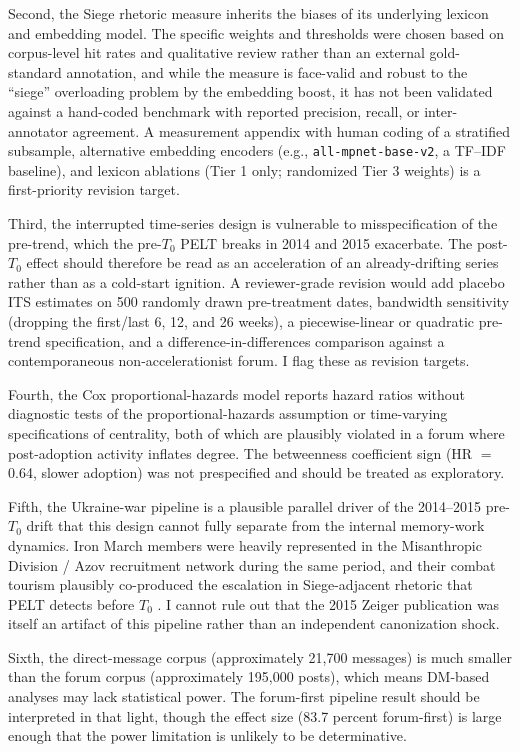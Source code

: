 \documentclass[bibtex,autowc,nonblind]{apsr_submission}
\begin{document}
Second, the Siege rhetoric measure inherits the biases of its underlying lexicon and embedding model. The specific weights and thresholds were chosen based on corpus-level hit rates and qualitative review rather than an external gold-standard annotation, and while the measure is face-valid and robust to the ``siege'' overloading problem by the embedding boost, it has not been validated against a hand-coded benchmark with reported precision, recall, or inter-annotator agreement. A measurement appendix with human coding of a stratified subsample, alternative embedding encoders (e.g., \texttt{all-mpnet-base-v2}, a TF--IDF baseline), and lexicon ablations (Tier 1 only; randomized Tier 3 weights) is a first-priority revision target.

Third, the interrupted time-series design is vulnerable to misspecification of the pre-trend, which the pre-$T_0$ PELT breaks in 2014 and 2015 exacerbate. The post-$T_0$ effect should therefore be read as an acceleration of an already-drifting series rather than as a cold-start ignition. A reviewer-grade revision would add placebo ITS estimates on 500 randomly drawn pre-treatment dates, bandwidth sensitivity (dropping the first/last 6, 12, and 26 weeks), a piecewise-linear or quadratic pre-trend specification, and a difference-in-differences comparison against a contemporaneous non-accelerationist forum. I flag these as revision targets.

Fourth, the Cox proportional-hazards model reports hazard ratios without diagnostic tests of the proportional-hazards assumption or time-varying specifications of centrality, both of which are plausibly violated in a forum where post-adoption activity inflates degree. The betweenness coefficient sign (HR $=$ 0.64, slower adoption) was not prespecified and should be treated as exploratory.

Fifth, the Ukraine-war pipeline is a plausible parallel driver of the 2014--2015 pre-$T_0$ drift that this design cannot fully separate from the internal memory-work dynamics. Iron March members were heavily represented in the Misanthropic Division / Azov recruitment network during the same period, and their combat tourism plausibly co-produced the escalation in Siege-adjacent rhetoric that PELT detects before $T_0$ \citep{colborne2022fires}. I cannot rule out that the 2015 Zeiger publication was itself an artifact of this pipeline rather than an independent canonization shock.

Sixth, the direct-message corpus (approximately 21,700 messages) is much smaller than the forum corpus (approximately 195,000 posts), which means DM-based analyses may lack statistical power. The forum-first pipeline result should be interpreted in that light, though the effect size (83.7 percent forum-first) is large enough that the power limitation is unlikely to be determinative.
\end{document}
